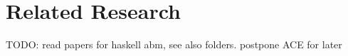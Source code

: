 \section{Related Research}
TODO: read papers for haskell abm, see also folders. postpone ACE for later
